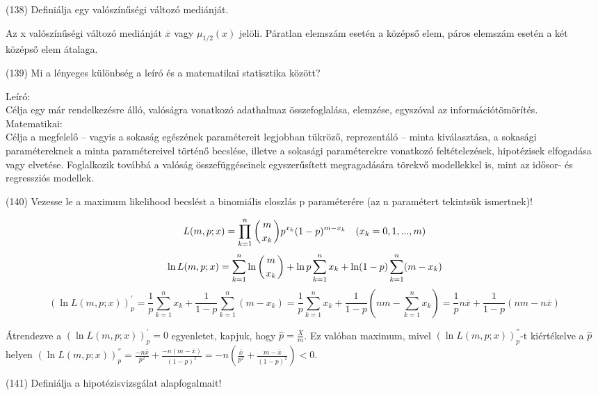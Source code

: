 \documentclass[12p]{article}
\begin{document}
(138) Definiálja egy valószínűségi változó mediánját.

Az x valószínűségi változó mediánját $\overline{x}$ vagy $\mu_{1/2}(x)$ jelöli.
Páratlan elemszám esetén a középső elem, páros elemszám esetén a két középső elem átalaga.

(139) Mi a lényeges különbség a leíró és a matematikai statisztika között?

Leíró:\\
Célja egy már rendelkezésre álló, valóságra vonatkozó adathalmaz összefoglalása, elemzése, egyszóval az információtömörítés.\\
Matematikai:\\
Célja a megfelelő – vagyis a sokaság egészének paramétereit legjobban tükröző, reprezentáló – minta kiválasztása, a sokasági paramétereknek a minta paramétereivel történő becslése, illetve a sokasági paraméterekre vonatkozó feltételezések, hipotézisek elfogadása vagy elvetése. Foglalkozik továbbá a valóság összefüggéseinek egyszerűsített megragadására törekvő modellekkel is, mint az idősor- és regressziós modellek.

(140) Vezesse le a maximum likelihood becslést a binomiális eloszlás p paraméterére (az n paramétert tekintsük ismertnek)!

$$L(m, p; x) = \prod_{k=1}^n \displaystyle{\left({m \atop x_k}\right)}p^{x_k}(1-p)^{m-x_k} \quad (x_k = 0, 1, ..., m)$$
$$\ln L(m, p; x) = \sum^n_{k=1} \ln \left ({m \atop x_k}\right) + \ln p \sum^n_{k=1} x_k + \ln(1-p) \sum^n_{k=1}(m-x_k)$$
$$(\ln L(m,p;x))^{'}_p = \frac{1}{p} \sum^n_{k=1}x_k + \frac{1}{1-p} \sum^n_{k=1} (m - x_k) = \frac{1}{p} \sum^n_{k=1}x_k + \frac{1}{1-p}
\left(nm- \sum^n_{k=1}x_k \right) = \frac{1}{p}n\overline{x} + \frac{1}{1-p}(nm-n\overline{x})$$

Átrendezve a $(\ln L(m,p;x))^{'}_p = 0$ egyenletet, kapjuk, hogy $\hat{p} = \frac{\overline{X}}{m}$.  Ez valóban maximum, mivel $(\ln L(m,p;x))^{''}_p$-t kiértékelve a $\hat{p}$ helyen $(\ln L(m,p;x))^{''}_p = \frac{-n \overline{x}}{p^2} + \frac{-n(m-\overline{x})}{(1-p)^2}=
-n\left(\frac{\overline{x}}{p^2}+\frac{m - \overline{x}}{(1-p)^2}\right)<0$.

(141) Definiálja a hipotézisvizsgálat alapfogalmait!
\end{document}
